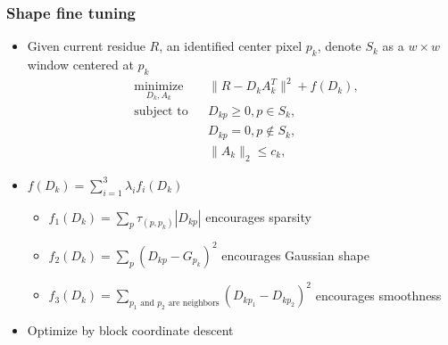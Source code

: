 \documentclass[16pt,presentation]{beamer}
\begin{document}
\begin{frame}
\frametitle{Shape fine tuning}
\begin{itemize}
\item Given current residue $R$, an identified center pixel $p_k$, denote $S_k$ as a $w \times w$ window centered at $p_k$
\[
\begin{aligned}
& \underset{D_k, A_k}{\text{minimize}}
& & \| R - D_k A_k^T \|^2 + f(D_k), \\%
& \text{subject to}
& & D_{kp} \geq 0, p \in S_k,\\
&
& & D_{kp} = 0, p \notin S_k,\\
& 
& & \|A_k\|_2 \leq c_k,
\end{aligned}
\]
\item $f(D_k) = \sum_{i=1}^3 \lambda_i f_i(D_k)$
\begin{itemize}
\item $f_1(D_k) = \sum_p \tau_{(p, p_k)} | D_{kp} |$ encourages sparsity
\item $f_2(D_k) = \sum_p (D_{kp} - G_{p_k})^2$ encourages Gaussian shape
\item $f_3(D_k) = \sum_{\text{$p_1$ and $p_2$ are neighbors}} (D_{kp_1} - D_{kp_2})^2$ encourages smoothness
\end{itemize}
\item Optimize by block coordinate descent
\end{itemize}
\end{frame}
\end{document}
